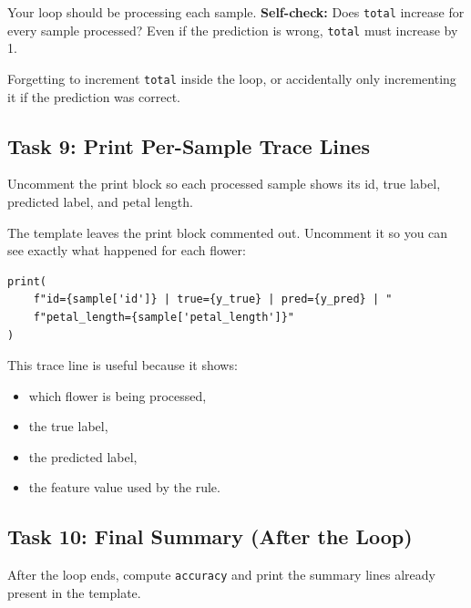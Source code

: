 \begin{tcolorbox}[title=Checkpoint]
Your loop should be processing each sample. \textbf{Self-check:} Does \texttt{total} increase for every sample processed? Even if the prediction is wrong, \texttt{total} must increase by 1.
\end{tcolorbox}
\begin{tcolorbox}[title=Common Mistakes]
Forgetting to increment \texttt{total} inside the loop, or accidentally only incrementing it if the prediction was correct.
\end{tcolorbox}

\subsection{Task 9: Print Per-Sample Trace Lines}
\begin{tcolorbox}[title=Task 9: Print per-sample trace exactly as required]
Uncomment the print block so each processed sample shows its id, true label, predicted label, and petal length.
\end{tcolorbox}

The template leaves the print block commented out. Uncomment it so you can see exactly what happened for each flower:
\begin{verbatim}
print(
    f"id={sample['id']} | true={y_true} | pred={y_pred} | "
    f"petal_length={sample['petal_length']}"
)
\end{verbatim}

\noindent
This trace line is useful because it shows:
\begin{itemize}
    \item which flower is being processed,
    \item the true label,
    \item the predicted label,
    \item the feature value used by the rule.
\end{itemize}

\subsection{Task 10: Final Summary (After the Loop)}
\begin{tcolorbox}[title=Task 10: Compute and print final metrics]
After the loop ends, compute \texttt{accuracy} and print the summary lines already present in the template.
\end{tcolorbox}

